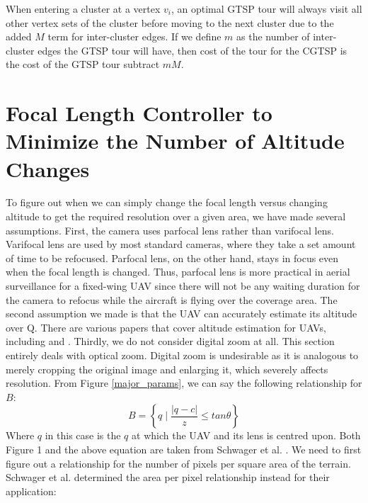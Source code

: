 \documentclass[conference]{IEEEtran}
\theoremstyle{plain}%
\begin{document}
When entering a cluster at a vertex $v_i$, an optimal GTSP tour will always visit all other vertex sets of the cluster before moving to the next cluster due to the added $M$ term for inter-cluster edges. If we define $m$ as the number of inter-cluster edges the GTSP tour will have, then cost of the tour for the CGTSP is the cost of the GTSP tour subtract $mM$.


\section{Focal Length Controller to Minimize the Number of Altitude Changes}

To figure out when we can simply change the focal length versus changing altitude to get the required resolution over a given area, we have made several assumptions. First, the camera uses parfocal lens rather than varifocal lens. Varifocal lens are used by most standard cameras, where they take a set amount of time to be refocused. Parfocal lens, on the other hand, stays in focus even when the focal length is changed. Thus, parfocal lens is more practical in aerial surveillance for a fixed-wing UAV since there will not be any waiting duration for the camera to refocus while the aircraft is flying over the coverage area.
The second assumption we made is that the UAV can accurately estimate its altitude over Q. There are various papers that cover altitude estimation for UAVs, including \cite{eynard2010uav} and \cite{cherian2009autonomous}.
Thirdly, we do not consider digital zoom at all. This section entirely deals with optical zoom. Digital zoom is undesirable as it is analogous to merely cropping the original image and enlarging it, which severely affects resolution.
From Figure \ref{major_params}, we can say the following relationship for $B$:
\begin{equation*}
B= \left\{q \mid  \frac{\lvert q-c \rvert}{z} \leq tan \theta  \right\}
\end{equation*}
Where $q$ in this case is the $q$ at which the UAV and its lens is centred upon. Both Figure 1 and the above equation are taken from Schwager et al. \cite{schwager2011eyes}.
We need to first figure out a relationship for the number of pixels per square area of the terrain. Schwager et al. determined the area per pixel relationship instead for their application:
\end{document}
